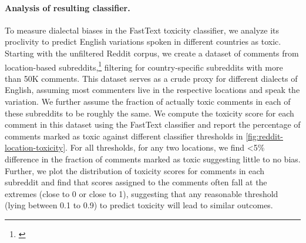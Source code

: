 \paragraph{Analysis of resulting classifier.} To measure dialectal biases in the FastText toxicity classifier, we analyze its proclivity to predict English variations spoken in different countries as toxic. %
Starting with the unfiltered Reddit corpus, we create a dataset of comments from location-based subreddits,\footnote{\href{https://www.reddit.com/r/LocationReddits/wiki/index/}{}} filtering for country-specific subreddits with more than 50K comments. This dataset serves as a crude proxy for different dialects of English, assuming most commenters live in the respective locations and speak the variation. We further assume the fraction of actually toxic comments in each of these subreddits to be roughly the same. We compute the toxicity score for each comment in this dataset using the FastText classifier and 
report the percentage of comments marked as toxic against different classifier thresholds in \autoref{fig:reddit-location-toxicity}.  For all thresholds, for any two locations, we find <5\% difference in the fraction of comments marked as toxic suggesting little to no bias. 
Further, we plot the distribution of toxicity scores for comments in each subreddit and find that scores assigned to the comments often fall at the extremes (close to 0 or close to 1), suggesting that any reasonable threshold (lying between 0.1 to 0.9) to predict toxicity will lead to similar outcomes.%
